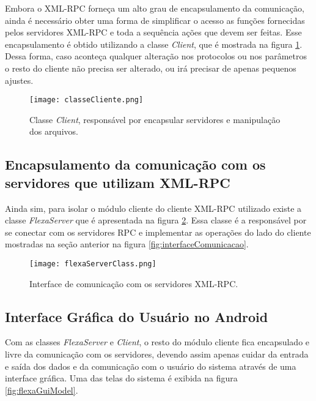         Embora o XML-RPC forneça um alto grau de encapsulamento da comunicação, ainda é necessário obter uma forma de simplificar o acesso as funções fornecidas pelos servidores XML-RPC e toda a sequência ações que devem ser feitas. Esse encapsulamento é obtido utilizando a classe \textit{Client}, que é mostrada na figura \ref{fig:clientClass}. Dessa forma, caso aconteça qualquer alteração nos protocolos ou nos parâmetros o resto do cliente não precisa ser alterado, ou irá precisar de apenas pequenos ajustes.
        
        \begin{figure}[!ht]
        \centering
        \texttt{[image: classeCliente.png]}
        \caption{Classe \textit{Client}, responsável por encapsular servidores e manipulação dos arquivos.}
        \label{fig:clientClass}
        \end{figure}
        
        
         \subsection{Encapsulamento da comunicação com os servidores que utilizam XML-RPC}
         
        Ainda sim, para isolar o módulo cliente do cliente XML-RPC utilizado existe a classe \textit{FlexaServer} que é apresentada na figura \ref{fig:flexaServer}. Essa classe é a responsável por se conectar com os servidores RPC e implementar as operações  do lado do cliente mostradas na seção anterior na figura \ref{fig:interfaceComunicacao}.
        
        \begin{figure}[!ht]
        \centering
        \texttt{[image: flexaServerClass.png]}
        \caption{Interface de comunicação com os servidores XML-RPC.}
        \label{fig:flexaServer}
        \end{figure}
        
        
        \subsection{Interface Gráfica do Usuário no Android}
        
        Com as classes \textit{FlexaServer} e \textit{Client}, o resto do módulo cliente fica encapsulado e livre da comunicação com os servidores, devendo assim apenas cuidar da entrada e saída dos dados e da comunicação com o usuário do sistema através de uma interface gráfica. Uma das telas do sistema é exibida na figura \ref{fig:flexaGuiModel}.
        

